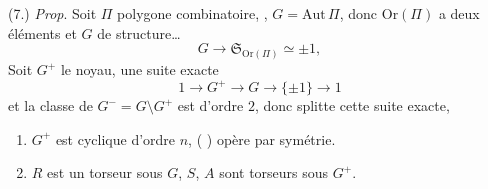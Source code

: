 \documentclass[11pt,a4paper]{article}
\begin{document}
(7.) \emph{Prop}. Soit $\Pi$  polygone combinatoire, , $G = \mathrm{Aut}\,\Pi$, donc $\mathrm{Or}(\Pi)$ a deux éléments et $G$  \ill{} de structure…
\[
  G \longrightarrow \mathfrak{S}_{\mathrm{Or}(\Pi)} \simeq \pm 1,
\]
\struck{\ill{}} Soit $G^{+}$ le noyau,  une suite exacte
\[
  1 \longrightarrow G^{+} \longrightarrow G \longrightarrow \{\pm 1\} \longrightarrow 1
\]
et la classe de $G^{-} = G \setminus G^{+}$ est d'ordre $2$, donc splitte cette suite exacte,
\begin{enumerate}
  \item[a)]  $G^{+}$ est cyclique d'ordre $n$, \struck{\ill{}} \add{\ill{}} ( ) \ill{} opère par symétrie.
  \item[b)] $R$ est un torseur sous $G$, $S$, $A$ sont torseurs sous $G^{+}$.
\end{enumerate}
\end{document}

